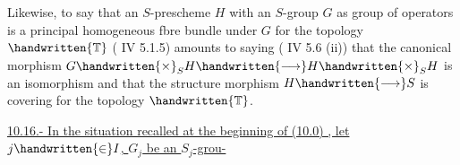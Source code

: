 Likewise, to say that an $S$-prescheme $H$ with an $S$-group $G$ as group of operators is a principal homogeneous fbre bundle under $G$ for the topology $\handwritten{\mathbb{T}}$ ( IV 5.1.5) amounts to saying ( IV 5.6 (ii)) that the canonical morphism $G\handwritten{\times}_S H\handwritten{\longrightarrow}H\handwritten{\times}_S H$ is an isomorphism and that the structure morphism $H\handwritten{\longrightarrow}S$ is covering for the topology $\handwritten{\mathbb{T}}$.

\uline{10.16.- In the situation recalled at the beginning of (10.0) , let $j\handwritten{\in}I$, $G_j$ be an $S_j$-grou-}
